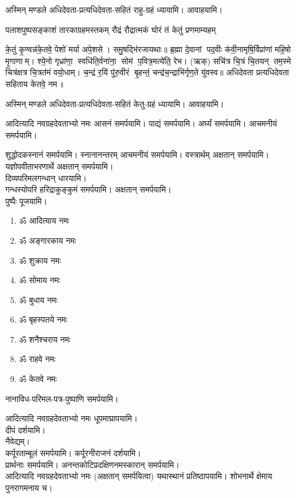 अस्मिन् मण्डले अधिदेवता-प्रत्यधिदेवता-सहितं राहु-ग्रहं ध्यायामि। आवाहयामि।

\twolineshloka
{पलाशपुष्पसङ्काशं तारकाग्रहमस्तकम्}
{रौद्रं रौद्रात्मकं घोरं तं केतुं प्रणमाम्यहम्}

के॒तुं कृ॒ण्वन्न॑के॒तवे॒ पेशो॑ मर्या अपे॒शसे। समु॒षद्भि॑रजायथाः॥ ब्र॒ह्मा दे॒वानां पद॒वीः
क॑वी॒नामृषि॒र्विप्रा॑णां महि॒षो मृ॒गाणाम्। श्ये॒नो गृध्रा॑णा॒ स्वधि॑ति॒र्वना॑ना॒ सोम॑
प॒वित्र॒मत्ये॑ति॒ रेभ\sn{}। (ऋक्) सचि॑त्र चि॒त्रं चि॒तयन् तम॒स्मे चित्र॑क्षत्र चि॒त्रत॑मं वयो॒धाम्।
च॒न्द्रं र॒यिं पु॑रु॒वीरं बृ॒हन्तं॒ चन्द्र॑च॒न्द्राभि॑र्गृण॒ते यु॑वस्व॥  अधिदेवता प्रत्यधिदेवता
सहिताय केतवे॒ नम॥ 

अस्मिन् मण्डले अधिदेवता-प्रत्यधिदेवता-सहितं केतु-ग्रहं ध्यायामि। आवाहयामि।

आदित्यादि नवग्रहदेवताभ्यो नमः आसनं समर्पयामि।
पाद्यं समर्पयामि। अर्घ्यं समर्पयामि। आचमनीयं समर्पयामि। 

शुद्धोदकस्नानं समर्पयामि। स्नानानन्तरम् आचमनीयं समर्पयामि।
वस्त्रार्थम् अक्षतान् समर्पयामि।\\
यज्ञोपवीताभरणार्थे अक्षतान् समर्पयामि।\\
दिव्यपरिमलगन्धान् धारयामि।\\
गन्धस्योपरि हरिद्राकुङ्कुमं समर्पयामि। अक्षतान् समर्पयामि। \\
पुष्पैः पूजयामि।

\begin{enumerate}%
\item ॐ आदित्याय नमः
\item ॐ अङ्गारकाय नमः
\item ॐ शुक्राय नमः
\item ॐ सोमाय नमः
\item ॐ बुधाय नमः
\item ॐ बृहस्पतये नमः
\item ॐ शनैश्चराय नमः
\item ॐ राहवे नमः
\item ॐ केतवे नमः
\end{enumerate}

नानाविध-परिमल-पत्र-पुष्पाणि समर्पयामि।

आदित्यादि नवग्रहदेवताभ्यो नमः धूपमाघ्रापयामि।\\
दीपं दर्शयामि।\\
नैवेद्यम्। \\
कर्पूरताम्बूलं समर्पयामि। कर्पूरनीराजनं दर्शयामि।\\
प्रार्थनाः समर्पयामि।
अनन्तकोटिप्रदक्षिणनमस्कारान् समर्पयामि।\\

आदित्यादि नवग्रहदेवताभ्यो नमः (अक्षतान् समर्पयित्वा) यथास्थानं प्रतिष्ठापयामि। शोभनार्थे क्षेमाय पुनरागमनाय च।
